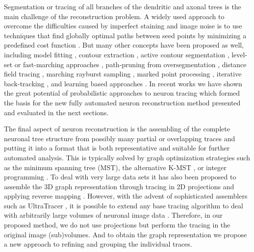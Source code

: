 Segmentation or tracing of all branches of the dendritic and axonal trees is the main challenge of the reconstruction problem. A widely used approach to overcome the difficulties caused by imperfect staining and image noise is to use techniques that find globally optimal paths between seed points by minimizing a predefined cost function \cite{meijering2004design, peng2011automatic, longair2011simple, quan2016neurogps}. But many other concepts have been proposed as well, including model fitting \cite{schmitt2004new,zhao2011automated}, contour extraction \cite{leandro2009automatic}, active contour segmentation \cite{wang2011broadly, luo2015neuron}, level-set or fast-marching approaches \cite{xiao2013app2, basu2014reconstructing}, path-pruning from oversegmentation \cite{peng2011automatic}, distance field tracing \cite{yang2013distance}, marching rayburst sampling \cite{ming2013rapid}, marked point processing \cite{basu2016neurite}, iterative back-tracking \cite{liu2016rivulet}, and learning based approaches \cite{chen2015smarttracing, gala2014active, santamaria2015automatic}. In recent works we have shown the great potential of probabilistic approaches to neuron tracing \cite{radojevic2015automated, radojevic2017automated, radojevic2017neuron} which formed the basis for the new fully automated neuron reconstruction method presented and evaluated in the next sections.

The final aspect of neuron reconstruction is the assembling of the complete neuronal tree structure from possibly many partial or overlapping traces and putting it into a format that is both representative and suitable for further automated analysis. This is typically solved by graph optimization strategies such as the minimum spanning tree (MST), the alternative K-MST \cite{turetken2011automated, gonzalez2010delineating}, or integer programming \cite{turetken2013reconstructing}. To deal with very large data sets it has also been proposed to assemble the 3D graph representation through tracing in 2D projections and applying reverse mapping \cite{zhou2016tremap}. However, with the advent of sophisticated assemblers such as UltraTracer \cite{peng2017automatic}, it is possible to extend any base tracing algorithm to deal with arbitrarily large volumes of neuronal image data \cite{peng2017automatic}. Therefore, in our proposed method, we do not use projections but perform the tracing in the original image (sub)volumes. And to obtain the graph representation we propose a new approach to refining and grouping the individual traces.

